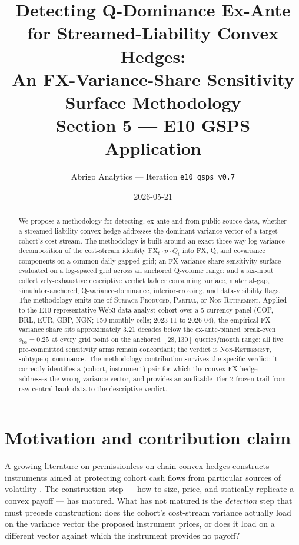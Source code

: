 \documentclass[11pt,letterpaper]{article}
\title{Detecting Q-Dominance Ex-Ante for Streamed-Liability Convex Hedges:\\[0.3em]
  An FX-Variance-Share Sensitivity Surface Methodology\\[0.6em]
  \large Section 5 --- E10 GSPS Application}
\author{Abrigo Analytics --- Iteration \texttt{e10\_gsps\_v0.7}}
\date{2026-05-21}
\newcommand{\sbe}{s_{\mathrm{be}}}
\newcommand{\Cfx}{\mathrm{FX}}
\theoremstyle{assumption}
\begin{document}
\maketitle

\begin{abstract}
We propose a methodology for detecting, ex-ante and from public-source data,
whether a streamed-liability convex hedge addresses the dominant variance
vector of a target cohort's cost stream. The methodology is built around an
exact three-way log-variance decomposition of the cost-stream identity
$\Cfx_t \cdot p \cdot Q_t$ into FX, Q, and covariance components on a common
daily gapped grid; an FX-variance-share sensitivity surface evaluated on a
log-spaced grid across an anchored Q-volume range; and a six-input
collectively-exhaustive descriptive verdict ladder consuming surface,
material-gap, simulator-anchored, Q-variance-dominance, interior-crossing, and
data-visibility flags. The methodology emits one of
\textsc{Surface-Produced}, \textsc{Partial}, or \textsc{Non-Retirement}.
Applied to the E10 representative Web3 data-analyst cohort over a 5-currency
panel (COP, BRL, EUR, GBP, NGN; 150 monthly cells; 2023-11 to 2026-04), the
empirical FX-variance share sits approximately 3.21 decades below the
ex-ante-pinned break-even $\sbe = 0.25$ at every grid point on the anchored
$[28, 130]$ queries/month range; all five pre-committed sensitivity arms
remain concordant; the verdict is \textsc{Non-Retirement}, subtype
\texttt{q\_dominance}. The methodology contribution survives the specific
verdict: it correctly identifies a (cohort, instrument) pair for which the
convex FX hedge addresses the wrong variance vector, and provides an
auditable Tier-2-frozen trail from raw central-bank data to the descriptive
verdict.
\end{abstract}

\section{Motivation and contribution claim}
\label{sec:e10-motivation}

A growing literature on permissionless on-chain convex hedges constructs
instruments aimed at protecting cohort cash flows from particular sources of
volatility \citep{LambertLyonsJiao2022,Maymin2026}. The construction step ---
how to size, price, and statically replicate a convex payoff
\citep{Lambert2022Panoptic} --- has matured. What has not matured is the
\emph{detection} step that must precede construction: does the cohort's
cost-stream variance actually load on the variance vector the proposed
instrument prices, or does it load on a different vector against which the
instrument provides no payoff?
\end{document}

